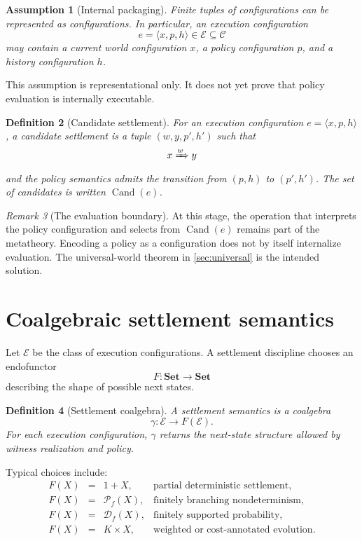 \documentclass[11pt]{article}
\newtheorem{definition}{Definition}[section]
\newtheorem{assumption}[definition]{Assumption}
\theoremstyle{remark}
\newtheorem{remark}[definition]{Remark}
\newcommand{\Conf}{\mathcal{C}}
\newcommand{\Exec}{\mathcal{E}}
\newcommand{\powerset}{\mathcal{P}}
\newcommand{\dist}{\mathcal{D}}
\newcommand{\cand}{\operatorname{Cand}}
\newcommand{\realizes}[1]{\xRightarrow{#1}}
\begin{document}
\begin{assumption}[Internal packaging]
Finite tuples of configurations can be represented as configurations. In
particular, an execution configuration
\[
  e=\langle x,p,h\rangle\in\Exec\subseteq\Conf
\]
may contain a current world configuration $x$, a policy configuration $p$, and
a history configuration $h$.
\end{assumption}

This assumption is representational only. It does not yet prove that policy
evaluation is internally executable.

\begin{definition}[Candidate settlement]
For an execution configuration $e=\langle x,p,h\rangle$, a candidate
settlement is a tuple $(w,y,p',h')$ such that
\[
  x\realizes{w}y
\]
and the policy semantics admits the transition from $(p,h)$ to $(p',h')$.
The set of candidates is written $\cand(e)$.
\end{definition}

\begin{remark}[The evaluation boundary]
At this stage, the operation that interprets the policy configuration and
selects from $\cand(e)$ remains part of the metatheory. Encoding a policy as a
configuration does not by itself internalize evaluation. The universal-world
theorem in \cref{sec:universal} is the intended solution.
\end{remark}

\section{Coalgebraic settlement semantics}
\label{sec:coalgebra}

Let $\Exec$ be the class of execution configurations. A settlement discipline
chooses an endofunctor
\[
  F:\mathbf{Set}\to\mathbf{Set}
\]
describing the shape of possible next states.

\begin{definition}[Settlement coalgebra]
A settlement semantics is a coalgebra
\[
  \gamma:\Exec\longrightarrow F(\Exec).
\]
For each execution configuration, $\gamma$ returns the next-state structure
allowed by witness realization and policy.
\end{definition}

Typical choices include:
\[
\begin{array}{rcll}
F(X)&=&1+X, & \text{partial deterministic settlement},\\
F(X)&=&\powerset_{\!f}(X), & \text{finitely branching nondeterminism},\\
F(X)&=&\dist_{\!f}(X), & \text{finitely supported probability},\\
F(X)&=&K\times X, & \text{weighted or cost-annotated evolution}.
\end{array}
\]
\end{document}
